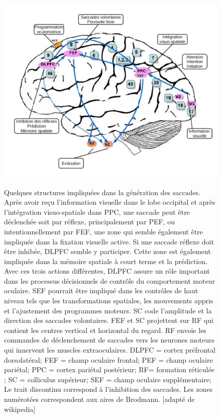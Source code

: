 \begin{figure}
\begin{center}
\includegraphics[width=14cm,height=10cm]{figures/ch2_5_Structures}
\end{center}
\caption{Quelques structures impliquées dans la génération des saccades. Après avoir reçu l'information visuelle dans le lobe occipital et après l'intégration visuo-spatiale dans PPC, une saccade peut être déclenchée soit par réflexe, principalement par PEF, ou intentionnellement par FEF, une zone qui semble également être impliquée dans la fixation visuelle active. Si une saccade réflexe doit être inhibée, DLPFC semble y participer. Cette zone est également impliquée dans la mémoire spatiale à court terme et la prédiction. Avec ces trois actions différentes, DLPFC assure un rôle important dans les processus décisionnels de contrôle du comportement moteur oculaire. SEF pourrait être impliqué dans les contrôles de haut niveau tels que les transformations spatiales, les mouvements appris et l'ajustement des programmes moteurs. SC code l'amplitude et la direction des saccades volontaires. FEF et SC projettent sur RF qui contient les centres vertical et horizontal du regard. RF envoie les commandes de déclenchement de saccades vers les neurones moteurs qui innervent les muscles extraoculaires. DLPFC = cortex préfrontal dorsolatéral; FEF = champ oculaire frontal; PEF = champ oculaire pariétal; PPC = cortex pariétal postérieur; RF= formation réticulée ; SC = colliculus supérieur; SEF = champ oculaire supplémentaire; Le trait discontinu correspond à l'inhibition des saccades. Les zones numérotées correspondent aux aires de Brodmann. [adapté de wikipedia]}

\label{struct}
\end{figure}
